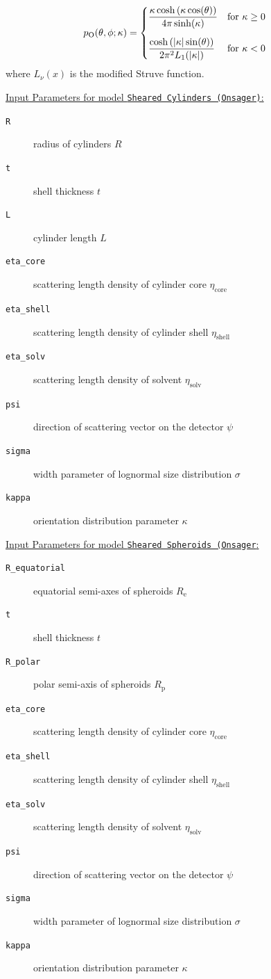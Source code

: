 \begin{align}
p_\mathrm{O}(\theta,\phi;\kappa) & =
\begin{cases} \displaystyle
\frac{\kappa \cosh\left(\kappa \cos(\theta)\right)}{4\pi \sinh(\kappa)}      &\mathrm{for~} \kappa \geq 0 \\[5mm]
 \displaystyle
\frac{\cosh\left({\left\vert\kappa\right\vert} \sin(\theta)\right)}{2\pi^2 L_1({\left\vert\kappa\right\vert})}  &\mathrm{for~} \kappa < 0
\end{cases}
\end{align}
where $L_\nu(x)$ is the modified Struve function.

\vspace{5mm}

\uline{Input Parameters for model \texttt{Sheared Cylinders (Onsager)}:}\\
\begin{description}
\item[\texttt{R}] radius of cylinders $R$
\item[\texttt{t}] shell thickness $t$
\item[\texttt{L}] cylinder length $L$
\item[\texttt{eta\_core}] scattering length density of cylinder core $\eta_\mathrm{core}$
\item[\texttt{eta\_shell}] scattering length density of cylinder shell $\eta_\mathrm{shell}$
\item[\texttt{eta\_solv}] scattering length density of solvent $\eta_\mathrm{solv}$
\item[\texttt{psi}] direction of scattering vector on the detector $\psi$
\item[{\texttt{sigma}}] width parameter of lognormal size distribution $\sigma$
\item[{\texttt{kappa}}] orientation distribution parameter $\kappa$
\end{description}

\vspace{5mm}

\uline{Input Parameters for model \texttt{Sheared Spheroids (Onsager}:}\\
\begin{description}
\item[\texttt{R\_equatorial}] equatorial semi-axes of spheroids $R_\mathrm{e}$
\item[\texttt{t}] shell thickness $t$
\item[\texttt{R\_polar}] polar semi-axis of spheroids $R_\mathrm{p}$
\item[\texttt{eta\_core}] scattering length density of cylinder core $\eta_\mathrm{core}$
\item[\texttt{eta\_shell}] scattering length density of cylinder shell $\eta_\mathrm{shell}$
\item[\texttt{eta\_solv}] scattering length density of solvent $\eta_\mathrm{solv}$
\item[\texttt{psi}] direction of scattering vector on the detector $\psi$
\item[{\texttt{sigma}}] width parameter of lognormal size distribution $\sigma$
\item[{\texttt{kappa}}] orientation distribution parameter $\kappa$
\end{description}

